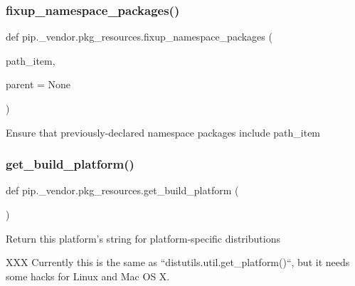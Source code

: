 \subsubsection{\texorpdfstring{fixup\+\_\+namespace\+\_\+packages()}{fixup\_namespace\_packages()}}
{\footnotesize\ttfamily def pip.\+\_\+vendor.\+pkg\+\_\+resources.\+fixup\+\_\+namespace\+\_\+packages (\begin{DoxyParamCaption}\item[{}]{path\+\_\+item,  }\item[{}]{parent = {\ttfamily None} }\end{DoxyParamCaption})}

\begin{DoxyVerb}Ensure that previously-declared namespace packages include path_item\end{DoxyVerb}
 \mbox{\label{namespacepip_1_1__vendor_1_1pkg__resources_ae7c894b8998697abd9ca6a173f5cbf83}} 
\subsubsection{\texorpdfstring{get\+\_\+build\+\_\+platform()}{get\_build\_platform()}}
{\footnotesize\ttfamily def pip.\+\_\+vendor.\+pkg\+\_\+resources.\+get\+\_\+build\+\_\+platform (\begin{DoxyParamCaption}{ }\end{DoxyParamCaption})}

\begin{DoxyVerb}Return this platform's string for platform-specific distributions

XXX Currently this is the same as ``distutils.util.get_platform()``, but it
needs some hacks for Linux and Mac OS X.
\end{DoxyVerb}
 \mbox{\label{namespacepip_1_1__vendor_1_1pkg__resources_a089c598fc768861704677fbf9d3834ca}} 
